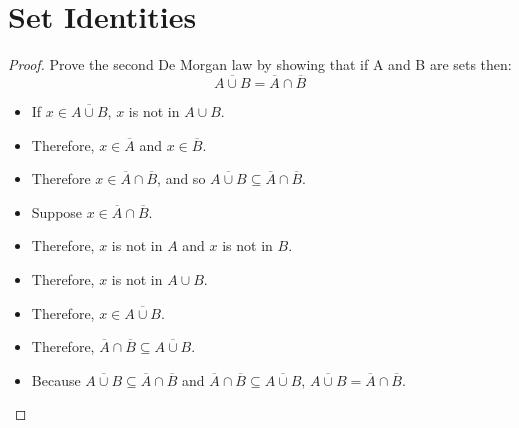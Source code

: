 \section{Set Identities}
\begin{proof}
    Prove the second De Morgan law by showing that if A and B are sets then:
    \begin{equation*}
        \overline{A \cup B} = \overline{A} \cap \overline{B}
    \end{equation*}
    \begin{itemize}
        \item If \(x \in \overline{A \cup B}\), \(x\) is not in \(A \cup B\).
        \item Therefore, \(x \in \overline{A}\) and \(x \in \overline{B}\).
        \item Therefore \(x \in \overline{A} \cap \overline{B}\), and so \(\overline{A \cup B} \subseteq \overline{A} \cap \overline{B}\).
        \item Suppose \(x \in \overline{A} \cap \overline{B}\).
        \item Therefore, \(x\) is not in \(A\) and \(x\) is not in \(B\).
        \item Therefore, \(x\) is not in \(A \cup B\).
        \item Therefore, \(x \in \overline{A \cup B}\).
        \item Therefore, \(\overline{A} \cap \overline{B} \subseteq \overline{A \cup B}\).
        \item Because \(\overline{A \cup B} \subseteq \overline{A} \cap \overline{B}\) and \(\overline{A} \cap \overline{B} \subseteq \overline{A \cup B}\), \(\overline{A \cup B} = \overline{A} \cap \overline{B}\).
    \end{itemize}
\end{proof}


